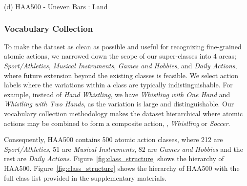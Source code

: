 \documentclass[10pt,twocolumn,letterpaper]{article}
\begin{document}
\begin{figure*}[t]
\begin{center}
\begin{center}
        	(d) HAA500 - Uneven Bars : Land
    	\end{center}
	\endminipage\hfill
\vspace{0.2em}
\caption{Different types of label noise in action recognition datasets. 
\textbf{(a)}: Kinetics400 has a fixed video length of 10 seconds which cannot accurately annotate quick actions like  where the irrelevant action of dribbling the ball is included in the clip. 
\textbf{(b)}: A camera cut can be seen, showing unrelated frames (audience) after the main action. 
\textbf{(c)}: By not having a frame-accurate clipping, the clip starts with a person-of-interest in the midair, and quickly disappears after few frames, causing the rest of the video clip to not have any person in action. 
\textbf{(d)}: Our HAA500 accurately annotates the full motion of  without any irrelevant frames. All the videos in the class starts with the exact frame an athlete puts the hand off the bar, to the exact frame when he/she finishes the landing pose. }
\label{fig:comparison_noise}
\end{center}
\vspace{-1em}
\end{figure*}

\subsubsection{Vocabulary Collection}

To make the dataset as clean as possible and useful for recognizing fine-grained atomic actions, we narrowed down the scope of our super-classes into 4 areas; \textit{Sport/Athletics}, \textit{Musical Instruments}, \textit{Games and Hobbies}, and \textit{Daily Actions}, where future extension beyond the existing classes is feasible. 
We select action labels where the variations within a class are typically indistinguishable. For example, instead of \textit{Hand Whistling}, we have \textit{Whistling with One Hand} and \textit{Whistling with Two Hands}, as the variation is large and distinguishable. 
Our vocabulary collection methodology makes the dataset hierarchical where atomic actions may be combined to form a composite action, \eg, \textit{Whistling} or \textit{Soccer}. 

Consequently, HAA500 contains 500 atomic action classes, where 212 are \textit{Sport/Athletics}, 51 are \textit{Musical Instruments}, 82 are \textit{Games and Hobbies} and the rest are \textit{Daily Actions}.
\ifcvprfinal
    Figure~\ref{fig:class_structure} shows the hierarchy of HAA500.
\else
    Figure~\ref{fig:class_structure} shows the hierarchy of HAA500 with the full class list provided in the supplementary materials.
\fi
\end{document}
